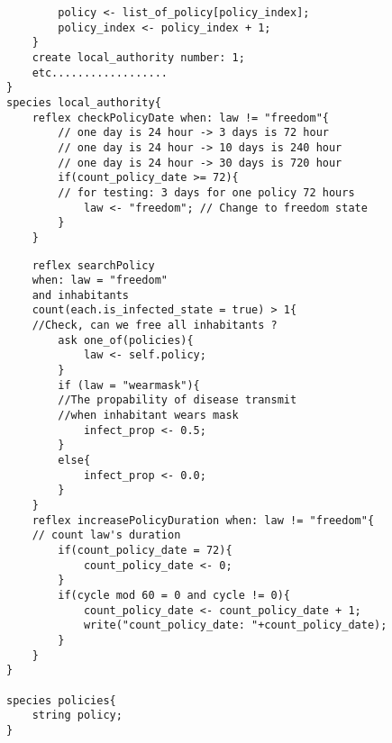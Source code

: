 \documentclass{article}
\begin{document}
\begin{pic15}
\begin{tcolorbox}
\begin{lstlisting}
		policy <- list_of_policy[policy_index];
		policy_index <- policy_index + 1;
	}
	create local_authority number: 1;
	etc..................
}
species local_authority{
	reflex checkPolicyDate when: law != "freedom"{
		// one day is 24 hour -> 3 days is 72 hour
		// one day is 24 hour -> 10 days is 240 hour
		// one day is 24 hour -> 30 days is 720 hour
		if(count_policy_date >= 72){
		// for testing: 3 days for one policy 72 hours
			law <- "freedom"; // Change to freedom state
		}
	}
\end{lstlisting}
\end{tcolorbox}
\begin{tcolorbox}
\begin{lstlisting}
	reflex searchPolicy 
	when: law = "freedom" 
	and inhabitants 
	count(each.is_infected_state = true) > 1{
	//Check, can we free all inhabitants ?
		ask one_of(policies){
			law <- self.policy;
		}
		if (law = "wearmask"){
		//The propability of disease transmit 
		//when inhabitant wears mask
			infect_prop <- 0.5; 
		}
		else{
			infect_prop <- 0.0;
		}
	}
	reflex increasePolicyDuration when: law != "freedom"{
	// count law's duration
		if(count_policy_date = 72){
			count_policy_date <- 0;
		}
		if(cycle mod 60 = 0 and cycle != 0){
			count_policy_date <- count_policy_date + 1;
			write("count_policy_date: "+count_policy_date);
		}
	}
}

species policies{
	string policy;
}


\end{lstlisting}
\end{tcolorbox}
\end{pic15}
\end{document}
